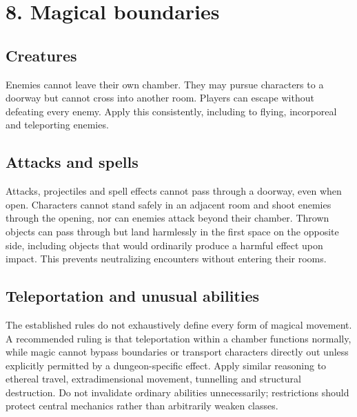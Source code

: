 \section{8. Magical boundaries}

\subsection{Creatures}

Enemies cannot leave their own chamber. They may pursue characters to a doorway but cannot cross into another room. Players can escape without defeating every enemy. Apply this consistently, including to flying, incorporeal and teleporting enemies.

\subsection{Attacks and spells}

Attacks, projectiles and spell effects cannot pass through a doorway, even when open. Characters cannot stand safely in an adjacent room and shoot enemies through the opening, nor can enemies attack beyond their chamber. Thrown objects can pass through but land harmlessly in the first space on the opposite side, including objects that would ordinarily produce a harmful effect upon impact. This prevents neutralizing encounters without entering their rooms.

\subsection{Teleportation and unusual abilities}

The established rules do not exhaustively define every form of magical movement. A recommended ruling is that teleportation within a chamber functions normally, while magic cannot bypass boundaries or transport characters directly out unless explicitly permitted by a dungeon-specific effect. Apply similar reasoning to ethereal travel, extradimensional movement, tunnelling and structural destruction. Do not invalidate ordinary abilities unnecessarily; restrictions should protect central mechanics rather than arbitrarily weaken classes.
